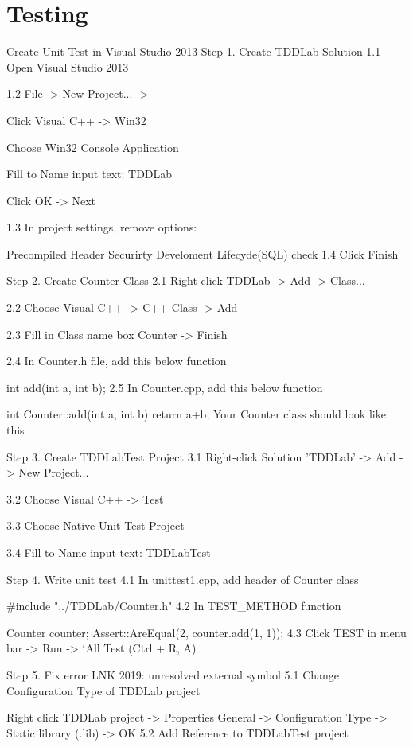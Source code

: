 \section{Testing}

Create Unit Test in Visual Studio 2013
Step 1. Create TDDLab Solution
1.1 Open Visual Studio 2013

1.2 File ->  New Project... ->

Click Visual C++ -> Win32

Choose Win32 Console Application

Fill to Name input text: TDDLab

Click OK -> Next

1.3 In project settings, remove options:

Precompiled Header
Securirty Develoment Lifecyde(SQL) check
1.4 Click Finish

Step 2. Create Counter Class
2.1 Right-click TDDLab -> Add -> Class...

2.2 Choose Visual C++ -> C++ Class -> Add

2.3 Fill in Class name box Counter -> Finish

2.4 In Counter.h file, add this below function

int add(int a, int b);
2.5 In Counter.cpp, add this below function

int Counter::add(int a, int b) {
  return a+b;
}
Your Counter class should look like this



Step 3. Create TDDLabTest Project
3.1 Right-click Solution 'TDDLab' -> Add -> New Project...

3.2 Choose Visual C++ -> Test

3.3 Choose Native Unit Test Project

3.4 Fill to Name input text: TDDLabTest

Step 4. Write unit test
4.1 In unittest1.cpp, add header of Counter class

#include "../TDDLab/Counter.h"
4.2 In TEST_METHOD function

{
  Counter counter;
  Assert::AreEqual(2, counter.add(1, 1));
}
4.3 Click TEST in menu bar -> Run -> `All Test (Ctrl + R, A)

Step 5. Fix error LNK 2019: unresolved external symbol
5.1 Change Configuration Type of TDDLab project

Right click  TDDLab project -> Properties
General -> Configuration Type -> Static library (.lib) -> OK
5.2 Add Reference to TDDLabTest project

